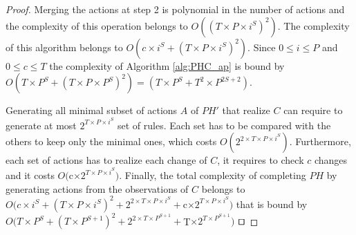 \begin{theorem}[Complexity]
\begin{proof}
		Merging the actions at step 2 is polynomial in the number of actions and the complexity of this operation belongs to $O((T\times P\times i^S)^2)$.
		The complexity of this algorithm belongs to $O(c\times i^S + (T\times P\times i^S)^2)$.
		Since $0 \leq i \leq P$ and $0 \leq c \leq T$ the complexity of Algorithm \ref{alg:PHC_ap} is bound by $O(T\times P^S + (T\times P\times P^S)^2) = (T\times P^S + T^2\times P^{2S+2})$.
		
		Generating all minimal subset of actions $A$ of $PH'$ that realize $C$ can require to generate at most $2^{T\times  P \times  i^S}$ set of rules.
		Each set has to be compared with the others to keep only the minimal ones, which costs $O(2^{2\times T\times  P \times  i^S})$.
		Furthermore, each set of actions has to realize each change of $C$, it requires to check $c$ changes and it costs $O($c$ \times  2^{T\times  P \times  i^S})$.
		Finally, the total complexity of completing $PH$ by generating actions from the observations of $C$ belongs to
		$O(c\times i^S + (T\times P\times i^S)^2 + 2^{2\times T\times  P \times  i^S} + $c$ \times  2^{T\times  P \times  i^S})$ that is bound by $O(T\times P^S + (T\times P^{S+1})^2 + 2^{2\times T\times P^{S+1}} + $T$ \times  2^{T\times  P^{S+1}})$
		$\qed$
	\end{proof}
\end{theorem}




